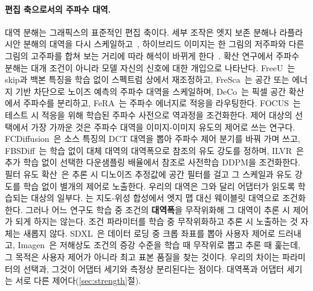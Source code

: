 \documentclass[10pt,twocolumn,a4paper]{article}
\begin{document}
\paragraph{편집 축으로서의 주파수 대역.} 대역 분해는 그래픽스의 표준적인 편집 축이다.
세부 조작은 엣지 보존 분해나 라플라시안 분해의 대역을 다시
스케일하고~\cite{farbman2008edge,paris2011local}, 하이브리드 이미지는 한 그림의 저주파와
다른 그림의 고주파를 합쳐 보는 거리에 따라 해석이 바뀌게 한다~\cite{oliva2006hybrid}.
확산 연구에서 주파수 분해는 대개 조건이 아니라 모델 자신의 신호에 대한 개입으로
나타난다. FreeU~\cite{si2023freeu}는 skip과 백본 특징을 학습 없이 스펙트럼 상에서
재조정하고, FreSca~\cite{huang2025fresca}는 공간 또는 에너지 기반 차단으로 노이즈 예측의
주파수 대역을 스케일하며, DeCo~\cite{ma2025deco}는 픽셀 공간 확산에서 주파수를 분리하고,
FeRA~\cite{yin2025fera}는 주파수 에너지로 적응을 라우팅한다. FOCUS~\cite{tjio2025focus}는
테스트 시 적응을 위해 학습된 주파수 사전으로 역과정을 조건화한다. 제어 대상의 선택에서
가장 가까운 것은 주파수 대역을 이미지-이미지 유도의 제어로 쓰는 연구다.
FCDiffusion~\cite{gao2024frequency}은 소스 특징의 DCT 대역을 뽑아 주파수 제어 분기를
바꿔 가며 쓰고, FBSDiff~\cite{gao2024fbsdiff}는 학습 없이 대체 대역의 대역폭으로 참조의
유도 강도를 정하며, ILVR~\cite{choi2021ilvr}은 추가 학습 없이 선택한 다운샘플링 배율에서
참조로 사전학습 DDPM을 조건화한다. 필터 유도 확산~\cite{gu2024filter}은 추론 시
디노이즈 추정값에 공간 필터를 걸고 그 스케일과 유도 강도를 학습 없이 별개의 제어로
노출한다. 우리의 대역은 그와 달리 어댑터가 읽도록 학습되는 대상의 일부다.
\citet{prasain2026beyond}는 지도-위성 합성에서 엣지 맵
대신 웨이블릿 대역으로 조건화한다. 그러나 어느 연구도 학습 중 조건의
\textbf{대역폭}을 무작위화해 그 대역이 추론 시 제어가 되게 하지는 않는다. 조건 파라미터를
학습 중 무작위화하고 추론 시 노출하는 것 자체는 새롭지 않다. SDXL~\cite{podell2023sdxl}은
데이터 로딩 중 크롭 좌표를 뽑아 사용자 제어로 드러내고,
Imagen~\cite{saharia2022photorealistic}은 저해상도 조건의 증강 수준을 학습 때 무작위로
뽑고 추론 때 훑는데, 그 목적은 사용자 제어가 아니라 최고 표본 품질을 찾는 것이다. 우리의
차이는 파라미터의 선택과, 그것이 어댑터 세기와 측정상 분리된다는 점이다. 대역폭과
어댑터 세기는 서로 다른 제어다(\ref{sec:strength}절).
\end{document}
